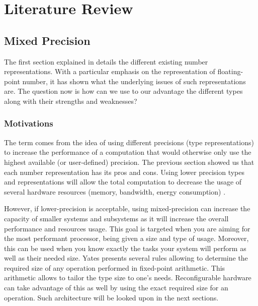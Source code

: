 \chapter{Literature Review} %

\label{Chapter3} %



\section{Mixed Precision}

The first section explained in details the different existing number representations. With a particular emphasis on the representation of floating-point number, it has shown what the underlying issues of such representations are. The question now is how can we use to our advantage the different types along with their strengths and weaknesses?

\subsection{Motivations}

The term  comes from the idea of using different precisions (type representations) to increase the performance of a computation that would otherwise only use the highest available (or user-defined) precision. The previous section showed us that each number representation has its pros and cons. Using lower precision types and representations will allow the total computation to decrease the usage of several hardware resources (memory, bandwidth, energy consumption) \cite{Horowitz2014,Nips2015}.

However, if lower-precision is acceptable, using mixed-precision can increase the capacity of smaller systems and subsystems as it will increase the overall performance and resources usage. This goal is targeted when you are aiming for the most performant processor, being given a size and type of usage. Moreover, this can be used when you know exactly the tasks your system will perform as well as their needed size. Yates \cite{Yates2007} presents several rules allowing  to determine the required size of any operation performed in fixed-point arithmetic. This arithmetic allows to tailor the type size to one's needs. Reconfigurable hardware can take advantage of this as well by using the exact required size for an operation. Such architecture will be looked upon in the next sections.


